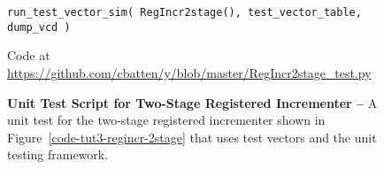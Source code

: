 \begin{figure}
\begin{lstlisting}[xleftmargin={0.9in}]
  run_test_vector_sim( RegIncr2stage(), test_vector_table, dump_vcd )
\end{lstlisting}

  \centerline{\small Code at
    \url{https://github.com/cbatten/y/blob/master/RegIncr2stage_test.py}}

  \caption{\textbf{Unit Test Script for Two-Stage Registered Incrementer
      --} A unit test for the two-stage registered incrementer shown in
    Figure~\ref{code-tut3-regincr-2stage} that uses test vectors and the
     unit testing framework.}
  \label{code-tut3-regincr-2stage-test}

\end{figure}

